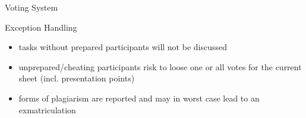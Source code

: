 \begin{frame}{\insertsubsection}
\begin{fancycolumns}[widths={30}]
\begin{definition}{Voting System }
\begin{itemize}
			\end{itemize}
		\end{definition}\pause\pause
		\begin{note}{Exception Handling}
			\begin{itemize}
				\item tasks without prepared participants will not be discussed
				\item unprepared/cheating participants risk to loose one or all votes for the current sheet (incl. presentation points)
				\item forms of plagiarism are reported and may in worst case lead to an exmatriculation
			\end{itemize}
		\end{note}
	\end{fancycolumns}
\end{frame}

